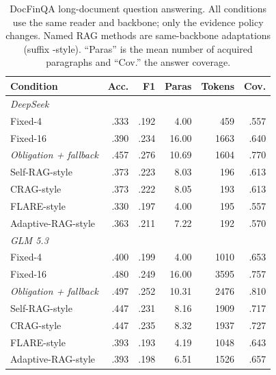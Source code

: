 \begin{table}[t]
\centering
\scriptsize
\setlength{\tabcolsep}{4pt}
\caption{DocFinQA long-document question answering. All conditions use the same reader and backbone; only the evidence policy changes. Named RAG methods are same-backbone adaptations (suffix -style). ``Paras'' is the mean number of acquired paragraphs and ``Cov.'' the answer coverage.}
\label{tab:docfinqa}
\begin{tabular}{lrrrrr}
\toprule
Condition & Acc. & F1 & Paras & Tokens & Cov. \\
\midrule
\multicolumn{6}{l}{\textit{DeepSeek}} \\
Fixed-4 & .333 & .192 & 4.00 & 459 & .557 \\
Fixed-16 & .390 & .234 & 16.00 & 1663 & .640 \\
\textit{Obligation + fallback} & .457 & .276 & 10.69 & 1604 & .770 \\
Self-RAG-style & .373 & .223 & 8.03 & 196 & .613 \\
CRAG-style & .373 & .222 & 8.05 & 193 & .613 \\
FLARE-style & .330 & .197 & 4.00 & 195 & .557 \\
Adaptive-RAG-style & .363 & .211 & 7.22 & 192 & .570 \\
\midrule
\multicolumn{6}{l}{\textit{GLM 5.3}} \\
Fixed-4 & .400 & .199 & 4.00 & 1010 & .653 \\
Fixed-16 & .480 & .249 & 16.00 & 3595 & .757 \\
\textit{Obligation + fallback} & .497 & .252 & 10.31 & 2476 & .810 \\
Self-RAG-style & .447 & .231 & 8.16 & 1909 & .717 \\
CRAG-style & .447 & .235 & 8.32 & 1937 & .727 \\
FLARE-style & .393 & .193 & 4.19 & 1048 & .643 \\
Adaptive-RAG-style & .393 & .198 & 6.51 & 1526 & .657 \\
\bottomrule
\end{tabular}
\end{table}
